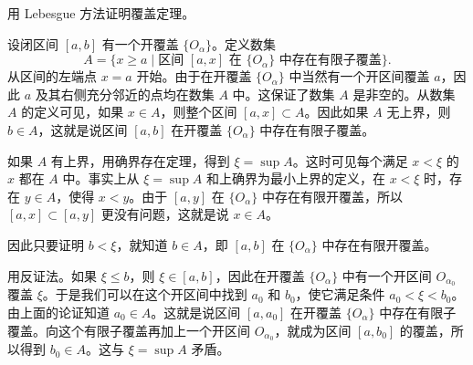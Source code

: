 \begin{xexample}[3.5.2]
用 Lebesgue 方法证明覆盖定理。
\end{xexample}
\begin{xproof}
设闭区间 $[a,b]$ 有一个开覆盖 $\{O_{\alpha}\}$。定义数集
\[
  A=\{x\geqslant a\mid \text{区间 }[a,x]\text{ 在 }\{O_{\alpha}\}\text{ 中存在有限子覆盖}\}.
\]
从区间的左端点 $x=a$ 开始。由于在开覆盖 $\{O_{\alpha}\}$ 中当然有一个开区间覆盖 $a$，因此 $a$ 及其右侧充分邻近的点均在数集 $A$ 中。这保证了数集 $A$ 是非空的。从数集 $A$ 的定义可见，如果 $x\in A$，则整个区间 $[a,x]\subset A$。因此如果 $A$ 无上界，则 $b\in A$，这就是说区间 $[a,b]$ 在开覆盖 $\{O_{\alpha}\}$ 中存在有限子覆盖。

如果 $A$ 有上界，用确界存在定理，得到 $\xi=\sup A$。这时可见每个满足 $x<\xi$ 的 $x$ 都在 $A$ 中。事实上从 $\xi=\sup A$ 和上确界为最小上界的定义，在 $x<\xi$ 时，存在 $y\in A$，使得 $x<y$。由于 $[a,y]$ 在 $\{O_{\alpha}\}$ 中存在有限开覆盖，所以 $[a,x]\subset[a,y]$ 更没有问题，这就是说 $x\in A$。

因此只要证明 $b<\xi$，就知道 $b\in A$，即 $[a,b]$ 在 $\{O_{\alpha}\}$ 中存在有限开覆盖。

用反证法。如果 $\xi\leqslant b$，则 $\xi\in[a,b]$，因此在开覆盖 $\{O_{\alpha}\}$ 中有一个开区间 $O_{\alpha_0}$ 覆盖 $\xi$。于是我们可以在这个开区间中找到 $a_0$ 和 $b_0$，使它满足条件 $a_0<\xi<b_0$。由上面的论证知道 $a_0\in A$。这就是说区间 $[a,a_0]$ 在开覆盖 $\{O_{\alpha}\}$ 中存在有限子覆盖。向这个有限子覆盖再加上一个开区间 $O_{\alpha_0}$，就成为区间 $[a,b_0]$ 的覆盖，所以得到 $b_0\in A$。这与 $\xi=\sup A$ 矛盾。
\end{xproof}

